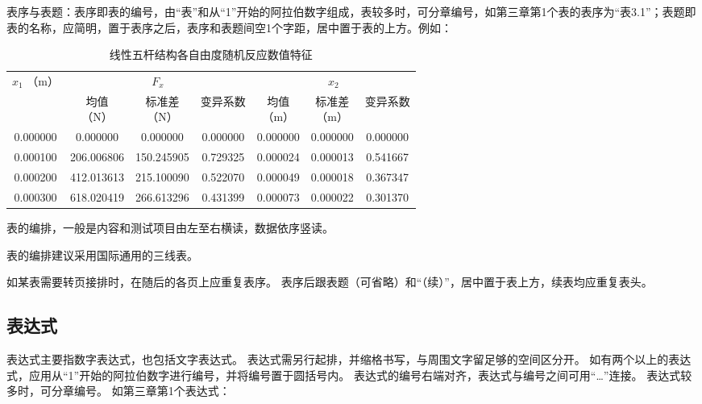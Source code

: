 表序与表题：表序即表的编号，由“表”和从“1”开始的阿拉伯数字组成，表较多时，可分章编号，如第三章第1个表的表序为“表3.1”；表题即表的名称，应简明，置于表序之后，表序和表题间空1个字距，居中置于表的上方。例如：

\begin{table}[H]
    \centering
    \caption{线性五杆结构各自由度随机反应数值特征}
    \label{tab:example}
    \begin{tabular}{c|c|c|c|c|c|c}
        \hline
        \multirowcell{2}[-7pt][c]{$x_{1}$                                                \\（m）} & \multicolumn{3}{c|}{$F_{x}$} & \multicolumn{3}{c}{$x_{2}$}                                             \\
        \cline{2-7}
                 & \makecell{均值                                                          \\（N）}                        & \makecell{标准差\\（N）}                      & 变异系数     & \makecell{均值\\（m）}    & \makecell{标准差\\（m）}   & 变异系数     \\
        \hline
        0.000000 & 0.000000     & 0.000000   & 0.000000 & 0.000000 & 0.000000 & 0.000000 \\
        0.000100 & 206.006806   & 150.245905 & 0.729325 & 0.000024 & 0.000013 & 0.541667 \\
        0.000200 & 412.013613   & 215.100090 & 0.522070 & 0.000049 & 0.000018 & 0.367347 \\
        0.000300 & 618.020419   & 266.613296 & 0.431399 & 0.000073 & 0.000022 & 0.301370 \\
        \hline
    \end{tabular}
\end{table}

表的编排，一般是内容和测试项目由左至右横读，数据依序竖读。

表的编排建议采用国际通用的三线表。

如某表需要转页接排时，在随后的各页上应重复表序。
表序后跟表题（可省略）和“（续）”，居中置于表上方，续表均应重复表头。

\subsection{表达式}

表达式主要指数字表达式，也包括文字表达式。
表达式需另行起排，并缩格书写，与周围文字留足够的空间区分开。
如有两个以上的表达式，应用从“1”开始的阿拉伯数字进行编号，并将编号置于圆括号内。
表达式的编号右端对齐，表达式与编号之间可用“…”连接。
表达式较多时，可分章编号。
如第三章第1个表达式：


